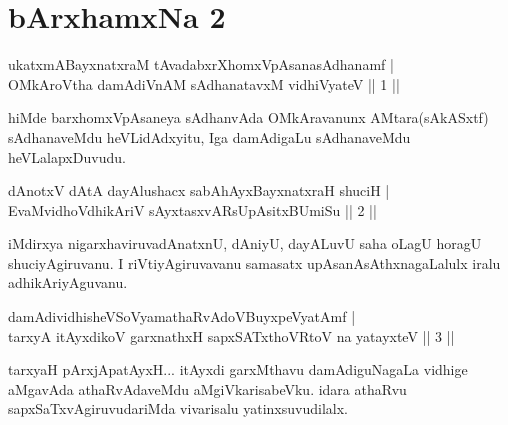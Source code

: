 
\section*{bArxhamxNa 2}

\begin{shl}
ukatxmABayxnatxraM tAvadabxrXhomxVpAsanasAdhanamf | \\
OMkAroV\s tha damAdiVnAM sAdhanatavxM vidhiVyateV \hfill||  1 || 
\end{shl}

\begin{artha}
hiMde barxhomxVpAsaneya sAdhanvAda OMkAravanunx AMtara(sAkASxtf) sAdhanaveMdu heVLidAdxyitu, Iga damAdigaLu sAdhanaveMdu heVLalapxDuvudu. 
\end{artha}


\begin{shl}
dAnotxV dAtA dayAlushacx sabAhAyxBayxnatxraH shuciH | \\
EvaMvidhoV\s dhikAriV sAyxtasxvARsUpAsitxBUmiSu \hfill||  2 ||
\end{shl}

\begin{artha}
iMdirxya nigarxhaviruvadAnatxnU, dAniyU, dayALuvU saha oLagU  horagU shuciyAgiruvanu. I riVtiyAgiruvavanu samasatx upAsanAsAthxnagaLalulx iralu adhikAriyAguvanu.
\end{artha}

\begin{shl}
damAdividhisheVSoV\s yamathaRvAdoV\s BuyxpeVyatAmf  | \\
 tarxyA itAyxdikoV garxnathxH sapxSATxthoVR\s toV na yatayxteV ||  3 || 
\end{shl}

\begin{artha}
tarxyaH pArxjApatAyxH... itAyxdi garxMthavu damAdiguNagaLa vidhige aMgavAda athaRvAdaveMdu aMgiVkarisabeVku. idara athaRvu sapxSaTxvAgiruvudariMda vivarisalu yatinxsuvudilalx.
\end{artha}

